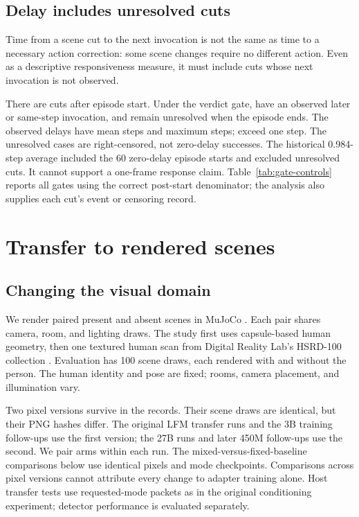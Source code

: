 \documentclass[10pt]{article}
\begin{document}
\subsection{Delay includes unresolved cuts}
Time from a scene cut to the next invocation is not the same as
time to a necessary action correction: some scene changes require
no different action. Even as a descriptive responsiveness measure,
it must include cuts whose next invocation is not observed.

There are \PostCuts{} cuts after episode start. Under the verdict
gate, \ResolvedCuts{} have an observed later or same-step invocation,
and \CensoredCuts{} remain unresolved when the episode ends.
The observed delays have mean \ResolvedDelay{} steps and maximum
\MaxDelay{} steps; \SlowCuts{} exceed one step. The unresolved
cases are right-censored, not zero-delay successes. The historical
0.984-step average included the 60 zero-delay episode starts and
excluded unresolved cuts. It cannot support a one-frame response
claim. Table~\ref{tab:gate-controls} reports all gates using the
correct post-start denominator; the analysis also supplies each
cut's event or censoring record.

\section{Transfer to rendered scenes}
\subsection{Changing the visual domain}
We render paired present and absent scenes in MuJoCo
\citep{mujoco}. Each pair shares camera, room, and lighting draws.
The study first uses capsule-based human geometry, then one
textured human scan from Digital Reality Lab's HSRD-100 collection
\citep{hsrd}. Evaluation has 100 scene draws, each rendered with
and without the person. The human identity and pose are fixed;
rooms, camera placement, and illumination vary.

Two pixel versions survive in the records. Their scene draws are
identical, but their PNG hashes differ. The original LFM transfer
runs and the 3B training follow-ups use the first version; the 27B
runs and later 450M follow-ups use the second. We pair arms within
each run. The mixed-versus-fixed-baseline comparisons below use
identical pixels and mode checkpoints. Comparisons across pixel
versions cannot attribute every change to adapter training alone.
Host transfer tests use requested-mode packets as in the original
conditioning experiment; detector performance is evaluated separately.
\end{document}
